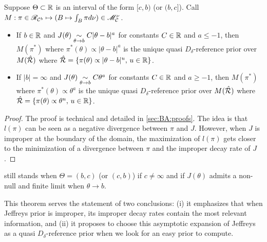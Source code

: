     \begin{thm}\label{thm:Jthetaa}
        Suppose $\Theta\subset\mathbb{R}$ is an interval of the form $[c,b)$ (or $(b,c]$). Call $M:\pi\in\mathscr{R}_{\mathcal{C}^b}\mapsto(B\mapsto\int_B \pi d\nu)\in\mathscr{M}^\nu_{\mathcal{C}}$. %
        \begin{itemize}
            \item If $b\in\mathbb{R}$ and $J(\theta)\underset{\theta\rightarrow b}{\sim}C|\theta-b|^a$ for constants $C\in\mathbb{R}$ and $a\leq-1$, then $M(\pi^\ast)$ where $\pi^\ast(\theta)\propto|\theta-b|^a$ is the unique quasi $D_\delta$-reference prior over $M(\hat{\mathcal{R}})$ where $\hat{\mathcal{R}} = \{\pi(\theta)\propto|\theta-b|^u,\,u\in\mathbb{R}\}$.
            \item If $|b|=\infty$ and $J(\theta)\underset{\theta\rightarrow b}{\sim}C\theta^a$ for constants $C\in\mathbb{R}$ and $a\geq-1$, then $M(\pi^\ast)$ where $\pi^\ast(\theta)\propto\theta^a$ is the unique quasi $D_\delta$-reference prior over $M(\hat{\mathcal{R}})$ where $\hat{\mathcal{R}} = \{\pi(\theta)\propto\theta^u,\,u\in\mathbb{R}\}$.
        \end{itemize}
    \end{thm}
    
    \begin{proof}
        The proof is technical and detailed in \cref{sec:BA:proofs}.
        The idea is that $l(\pi)$ can be seen as a negative divergence between $\pi$ and $J$. However, when $J$ is improper at the boundary of the domain, the maximization of $l(\pi)$ gets closer to the minimization of a divergence between $\pi$ and the improper decay rate of $J$.
    \end{proof}
    
    
    \begin{rem}
         still stands when $\Theta=(b,c)$ (or $(c,b)$) if $c\ne\infty$ and if $J(\theta)$ admits a non-null and finite limit when $\theta\to b$.
    \end{rem}
    
    
    
    
    This theorem serves the statement of two conclusions: (i) it emphasizes that when Jeffreys prior is improper, its improper decay rates contain the most relevant information, and (ii) it proposes to choose this asymptotic expansion of Jeffreys as a quasi $D_\delta$-reference prior when we look for an easy prior to compute.
    
    
    






